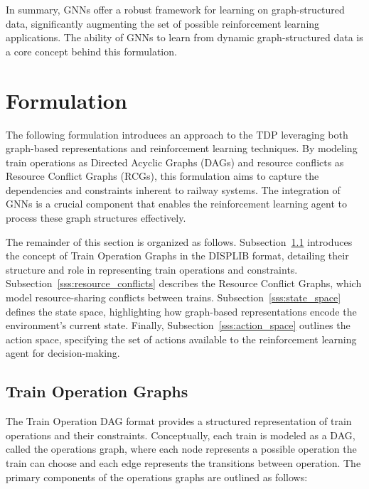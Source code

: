 \documentclass[runningheads]{llncs}
\begin{document}
In summary, GNNs offer a robust framework for learning on graph-structured data, significantly augmenting the set of possible reinforcement learning applications.
The ability of GNNs to learn from dynamic graph-structured data is a core concept behind this formulation.

\section{Formulation}
\label{sse:formulation}
The following formulation introduces an approach to the TDP leveraging both graph-based representations and reinforcement learning techniques. 
By modeling train operations as Directed Acyclic Graphs (DAGs) and resource conflicts as Resource Conflict Graphs (RCGs), this formulation aims to capture the dependencies and constraints inherent to railway systems. 
The integration of GNNs is a crucial component that enables the reinforcement learning agent to process these graph structures effectively.

The remainder of this section is organized as follows. 
Subsection~\ref{sss:train_ops} introduces the concept of Train Operation Graphs in the DISPLIB format, detailing their structure and role in representing train operations and constraints. 
Subsection~\ref{sss:resource_conflicts} describes the Resource Conflict Graphs, which model resource-sharing conflicts between trains. Subsection~\ref{sss:state_space} defines the state space, highlighting how graph-based representations encode the environment's current state. 
Finally, Subsection~\ref{sss:action_space} outlines the action space, specifying the set of actions available to the reinforcement learning agent for decision-making.

\subsection{Train Operation Graphs}
\label{sss:train_ops}

The Train Operation DAG format provides a structured representation of train operations and their constraints. 
Conceptually, each train is modeled as a DAG, called the operations graph, where each node represents a possible operation the train can choose and each edge represents the transitions between operation.
The primary components of the operations graphs are outlined as follows:
\end{document}
